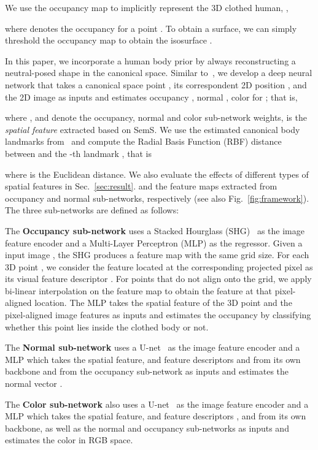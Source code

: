 \documentclass[10pt,twocolumn,letterpaper]{article}
\begin{document}
We use the occupancy map  to implicitly represent the 3D clothed human, \ie, 

where  denotes the occupancy for a point . To obtain a surface, we can simply threshold  the occupancy map  to obtain the isosurface .


In this paper, we incorporate a human body prior by always reconstructing a neutral-posed shape in the canonical space.
Similar to~\cite{PIFuICCV19}, we develop a deep neural network that takes a canonical space point , its correspondent 2D position , and the 2D image  as inputs and estimates occupancy , normal , color  for ; that is,

where ,  and  denote the occupancy, normal and color sub-network weights,  is the \emph{spatial feature} extracted based on SemS. We use the estimated  canonical body landmarks from~\cite{DenseRaCICCV19} and compute the Radial Basis Function (RBF) distance between  and the -th landmark , that is

where  is the Euclidean distance. We also evaluate the effects of different types of spatial features in Sec.~\ref{sec:result}.
 and  the feature maps extracted from occupancy and normal sub-networks, respectively (see also Fig.~\ref{fig:framework}). The three sub-networks are defined as follows:

The \textbf{Occupancy sub-network} uses a Stacked Hourglass (SHG)~\cite{newell2016stacked} as the image feature encoder and a Multi-Layer Perceptron (MLP) as the regressor. Given a  input image , the SHG produces a feature map  with the same grid size. For each 3D point , we consider the feature located at the corresponding projected pixel  as its visual feature descriptor . For points that do not align onto the grid, we apply bi-linear interpolation on the feature map to obtain the feature at that pixel-aligned location.
The MLP takes the spatial feature of the 3D point  and the pixel-aligned image features  as inputs and estimates the occupancy  by classifying whether this point lies inside the clothed body or not. 


The \textbf{Normal sub-network} uses a U-net~\cite{U-Net} as the image feature encoder and a MLP which takes the spatial feature, and feature descriptors  and  from its own backbone and from the occupancy sub-network as inputs and estimates the normal vector .

The \textbf{Color sub-network} also uses a U-net~\cite{U-Net} as the image feature encoder and a MLP which takes the spatial feature, and feature descriptors ,  and  from its own backbone, as well as the normal and occupancy sub-networks as inputs and estimates the color  in RGB space.
\end{document}
